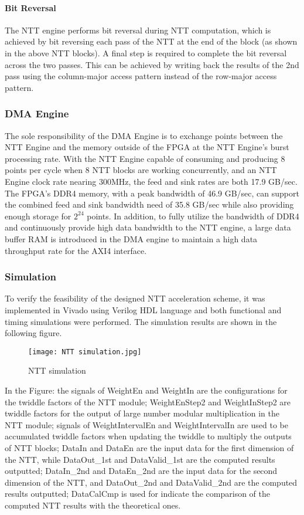 \paragraph*{Bit Reversal}
The NTT engine performs bit reversal during NTT computation, which is achieved by bit reversing each pass of the NTT at the end of the block (as shown in the above NTT blocks). A final step is required to complete the bit reversal across the two passes. This can be achieved by writing back the results of the 2nd pass using the column-major access pattern instead of the row-major access pattern.


\subsubsection{DMA Engine}

The sole responsibility of the DMA Engine is to exchange points between the NTT Engine and the memory outside of the FPGA at the NTT Engine's burst processing rate. With the NTT Engine capable of consuming and producing 8 points per cycle when 8 NTT blocks are working concurrently, and an NTT Engine clock rate nearing 300MHz, the feed and sink rates are both 17.9 GB/sec. The FPGA's DDR4 memory, with a peak bandwidth of 46.9 GB/sec, can support the combined feed and sink bandwidth need of 35.8 GB/sec while also providing enough storage for $2^{24}$ points.
  In addition, to fully utilize the bandwidth of DDR4 and continuously provide high data bandwidth to the NTT engine, a large data buffer RAM is introduced in the DMA engine to maintain a high data throughput rate for the AXI4 interface.

\subsubsection{Simulation}

To verify the feasibility of the designed NTT acceleration scheme, it was implemented in Vivado using Verilog HDL language and both functional and timing simulations were performed. The simulation results are shown in the following figure.

\begin{figure}[h]
  \centering
  \texttt{[image: NTT simulation.jpg]}
  \caption{NTT simulation}
  \label{fig:NTT_Simu}
\end{figure}

In the Figure: the signals of WeightEn and WeightIn are the configurations for the twiddle factors of the NTT module; WeightEnStep2 and WeightInStep2 are twiddle factors for the output of large number modular multiplication in the NTT module; signals of WeightIntervalEn and WeightIntervalIn are used to be accumulated twiddle factors when updating the twiddle to multiply the outputs of NTT blocks; DataIn and DataEn are the input data for the first dimension of the NTT, while DataOut\_1st and DataValid\_1st are the computed results outputted; DataIn\_2nd and DataEn\_2nd are the input data for the second dimension of the NTT, and DataOut\_2nd and DataValid\_2nd are the computed results outputted; DataCalCmp is used for indicate the comparison of the computed NTT results with the theoretical ones.

